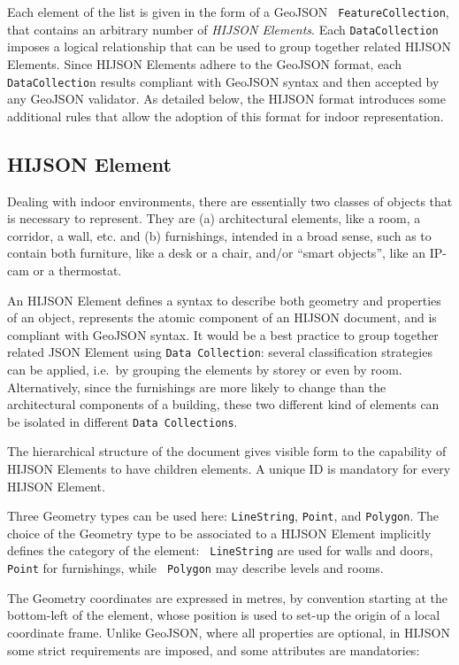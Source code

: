 Each element of the list is given in the form of a GeoJSON {\tt
FeatureCollection}, that contains an arbitrary  number of \emph{HIJSON Elements}.
Each {\tt DataCollection} imposes a logical relationship that can be used
to group together related HIJSON Elements. Since  HIJSON Elements adhere to
the GeoJSON format, each {\tt DataCollectio}n results compliant with GeoJSON
syntax and then accepted by any GeoJSON validator. As detailed below, the
HIJSON format  introduces some additional rules that allow the adoption of
this format for indoor representation.


\subsection{HIJSON Element}

Dealing with indoor environments, there are essentially two classes of objects
that is necessary to represent. They are (a) architectural elements, like a
room, a corridor, a wall, etc. and (b) furnishings, intended in a broad sense,
such as to contain both furniture, like a desk or a chair, and/or ``smart objects'',
like an IP-cam or a thermostat.

An HIJSON Element defines a syntax to describe both geometry and properties of
an object, represents the atomic component of an HIJSON document, and is compliant with GeoJSON syntax. 
It would be a best practice to group
together related JSON Element using {\tt Data Collection}: several classification strategies
can be applied, i.e.~by grouping the elements by storey or even by room.
Alternatively, since the furnishings are more likely to change than the
architectural components of a building, these two different kind of elements
can be isolated in different {\tt Data Collections}.

The hierarchical structure of the document gives visible form to the capability of HIJSON Elements to have children elements. A unique ID is mandatory for every HIJSON Element. 

Three Geometry types can be used here: {\tt LineString},
{\tt Point}, and {\tt Polygon}. The choice of the Geometry type to be associated to
a HIJSON Element implicitly defines the category of the element: {\tt
LineString} are used for walls and doors, {\tt Point} for furnishings, while {\tt
Polygon} may describe levels and rooms.

The Geometry coordinates are expressed in metres, by convention starting
at the bottom-left of the element, whose position is used to set-up the origin of a local coordinate frame. Unlike GeoJSON, where all properties
are optional, in HIJSON some strict requirements are imposed, and some
attributes are mandatories:

